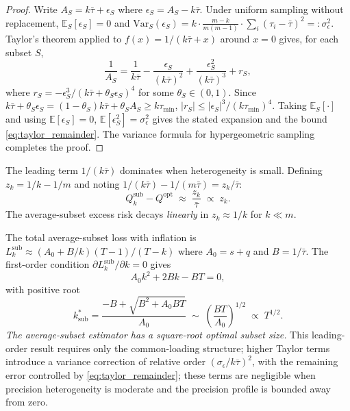 \documentclass[12pt,a4paper]{article}
\theoremstyle{definition}
\newcommand{\Qopt}{Q^{\mathrm{opt}}}
\newcommand{\Qsub}{Q_k^{\mathrm{sub}}}
\newcommand{\E}{\mathbb{E}}
\newcommand{\Var}{\mathrm{Var}}
\begin{document}
\begin{proof}
Write $A_S=k\bar\tau+\epsilon_S$ where $\epsilon_S=A_S-k\bar\tau$.
Under uniform sampling without replacement,
$\E_S[\epsilon_S]=0$ and
$\Var_S(\epsilon_S)=k\!\cdot\!\frac{m-k}{m(m-1)}\!\cdot\!\sum_i(\tau_i-\bar\tau)^2=:\sigma_\epsilon^2$.
Taylor's theorem applied to $f(x)=1/(k\bar\tau+x)$ around $x=0$ gives,
for each subset $S$,
\[
\frac{1}{A_S}=\frac{1}{k\bar\tau}-\frac{\epsilon_S}{(k\bar\tau)^2}
+\frac{\epsilon_S^2}{(k\bar\tau)^3}+r_S,
\]
where $r_S=-\epsilon_S^3/(k\bar\tau+\theta_S\epsilon_S)^4$ for some
$\theta_S\in(0,1)$.  Since
$k\bar\tau+\theta_S\epsilon_S=(1-\theta_S)k\bar\tau+\theta_S A_S\ge k\tau_{\min}$,
$|r_S|\le |\epsilon_S|^3/(k\tau_{\min})^4$.
Taking $\E_S[\cdot]$ and using $\E[\epsilon_S]=0$, $\E[\epsilon_S^2]=\sigma_\epsilon^2$
gives the stated expansion and the bound \eqref{eq:taylor_remainder}.  The
variance formula for hypergeometric sampling completes the proof.
\end{proof}

The leading term $1/(k\bar\tau)$ dominates when heterogeneity is small.
Defining $z_k=1/k-1/m$ and noting $1/(k\bar\tau)-1/(m\bar\tau)=z_k/\bar\tau$:
\begin{equation}\label{eq:Qsub_approx}
  \Qsub - \Qopt \;\approx\; \frac{z_k}{\bar\tau} \;\propto\; z_k.
\end{equation}
The average-subset excess risk decays \emph{linearly} in $z_k\approx 1/k$
for $k\ll m$.

The total average-subset loss with inflation is
$L_k^{\mathrm{sub}}\approx(A_0+B/k)(T-1)/(T-k)$
where $A_0=s+q$ and $B=1/\bar\tau$.  The first-order condition
$\partial L_k^{\mathrm{sub}}/\partial k=0$ gives
\begin{equation}
  A_0k^2 + 2Bk - BT = 0,
\end{equation}
with positive root
\begin{equation}\label{eq:kstar_sub}
  k^*_{\mathrm{sub}} = \frac{-B+\sqrt{B^2+A_0BT}}{A_0}
  \;\sim\; \left(\frac{BT}{A_0}\right)^{1/2}
  \;\propto\; T^{1/2}.
\end{equation}
\emph{The average-subset estimator has a square-root optimal subset size.}
This leading-order result requires only the common-loading structure; higher
Taylor terms introduce a variance correction of relative order
$(\sigma_\epsilon/k\bar\tau)^2$, with the remaining error controlled by
\eqref{eq:taylor_remainder}; these terms are negligible when precision
heterogeneity is moderate and the precision profile is bounded away from zero.
\end{document}
